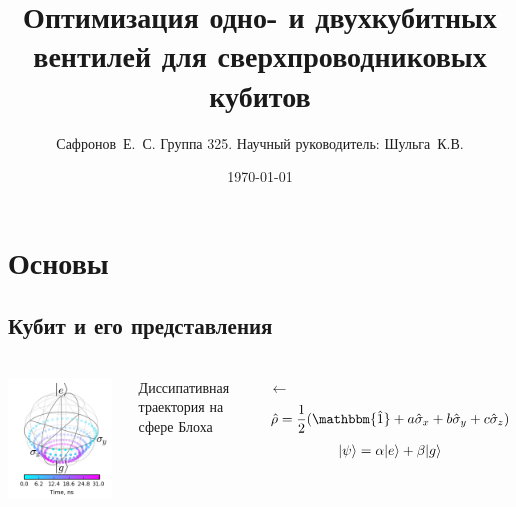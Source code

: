\documentclass[aspectratio=169, 13pt]{beamer}
\title{Оптимизация одно- и двухкубитных вентилей для сверхпроводниковых кубитов}
\author{Сафронов~Е.~С. Группа 325. \quad Научный руководитель: Шульга~К.В.}
\date{\today}
\DeclarePairedDelimiter\ket{\lvert}{\rangle}
\begin{document}
{
\begin{frame}[plain]
  \titlepage
\end{frame}
}

\frame[plain]{\tableofcontents}

\section{Основы}
\subsection{Кубит и его представления}
\begin{frame}[c]\frametitle{\secname}\framesubtitle{\subsecname}

\begin{columns}[c]
\centering
\includegraphics[width=0.95\textwidth]{bloch_sphere_dissipative}

Диссипативная траектория на сфере Блоха

\vspace{5cm}
$\leftarrow$
\centering
\begin{gather*}
\hat \rho = \frac{1}{2}(\mathbbm{\hat 1} + a\hat \sigma_x+b\hat \sigma_y + c\hat \sigma_z)
\end{gather*}
\begin{gather*}
\ket{\psi} = \alpha \ket{e} + \beta \ket{g}
\end{gather*}


\end{columns}
\end{frame}
\end{document}
